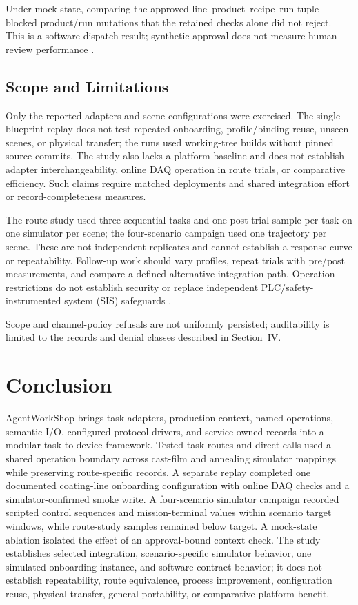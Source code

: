 Under mock state, comparing the approved line--product--recipe--run tuple
blocked product/run mutations that the retained checks alone did not reject.
This is a software-dispatch result; synthetic approval does not measure human
review performance \cite{parasuramanmanzey2010complacency,parasuraman2000model,bainbridge1983ironies}.

\subsection{Scope and Limitations}
Only the reported adapters and scene configurations were exercised. The
single blueprint replay does not test repeated onboarding, profile/binding
reuse, unseen scenes, or physical transfer; the runs used working-tree builds without pinned
source commits. The study also lacks a platform baseline and does not establish
adapter interchangeability, online DAQ operation in route trials, or comparative
efficiency. Such claims require matched deployments and shared integration
effort or record-completeness measures.

The route study used three sequential tasks and one post-trial sample per task
on one simulator per scene; the four-scenario campaign used one trajectory per
scene. These are not independent replicates and cannot establish a response
curve or repeatability. Follow-up work should vary profiles, repeat trials
with pre/post measurements, and compare a defined alternative integration
path. Operation restrictions do not establish security
\cite{greshake2023injection,liu2024pinjection,iec62443-3-3} or replace
independent PLC/safety-instrumented system (SIS) safeguards \cite{iec61511}.

Scope and channel-policy refusals are not uniformly persisted; auditability
is limited to the records and denial classes described in Section~IV.

\section{Conclusion}
\label{sec:conclusion}
AgentWorkShop brings task adapters, production context, named operations,
semantic I/O, configured protocol drivers, and service-owned records into a
modular task-to-device framework. Tested task routes and direct calls used a
shared operation boundary across cast-film and annealing simulator mappings
while preserving route-specific records. A separate replay completed one
documented coating-line onboarding configuration with online DAQ checks and a
simulator-confirmed smoke write. A four-scenario simulator campaign recorded
scripted control sequences and mission-terminal values within scenario target
windows, while route-study samples remained below target. A mock-state ablation
isolated the effect of an approval-bound context check. The study establishes
selected integration, scenario-specific simulator behavior, one simulated
onboarding instance, and software-contract behavior; it does not establish
repeatability, route equivalence, process improvement, configuration reuse,
physical transfer, general portability, or comparative platform benefit.
